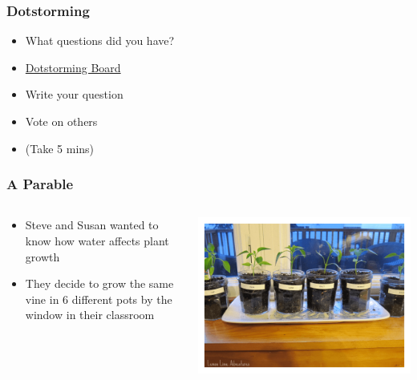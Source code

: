 \documentclass[14pt]{beamer}
\begin{document}
\begin{frame}
\frametitle{Dotstorming}
\begin{itemize}
	\item What questions did you have?
	\item \href{https://dotstorming.com/b/59b6a35f3b45421106effc50}{Dotstorming Board}
	\item Write your question
	\item Vote on others
	\item (Take 5 mins)
\end{itemize}
\end{frame}

\begin{frame}
\frametitle{A Parable}
\begin{columns}
	\begin{column}{0.5\textwidth}
		\begin{itemize}
			\item<+-> Steve and Susan wanted to know how water affects plant growth
			\item<+-> They decide to grow the same vine in 6 different pots by the window in their classroom
		\end{itemize}
		\end{column}
	\begin{column}{0.5\textwidth}
		\begin{center}
     		\includegraphics[width=1\textwidth]{images_20170912_vines.png}
     	\end{center}
	\end{column}
\end{columns}
\end{frame}
\end{document}
